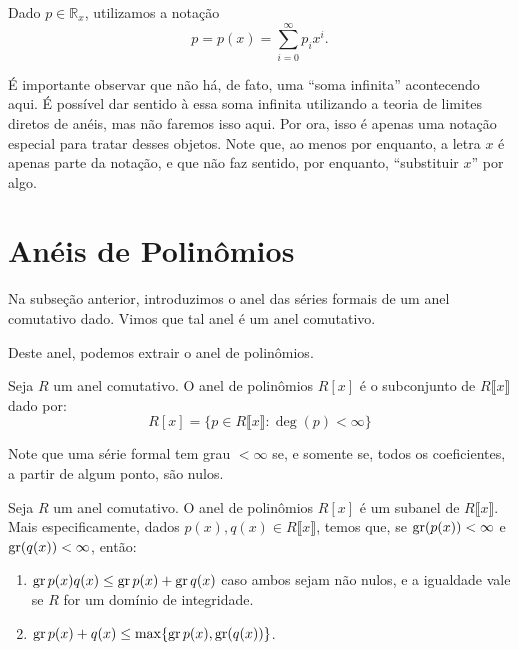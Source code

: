 Dado $p \in \mathbb R_x$, utilizamos a notação $$p=p(x)=\sum_{i=0}^\infty p_ix^i.$$

É importante observar que não há, de fato, uma ``soma infinita'' acontecendo aqui. É possível dar sentido à essa soma infinita utilizando a teoria de limites diretos de anéis, mas não faremos isso aqui. Por ora, isso é apenas uma notação especial para tratar desses objetos. Note que, ao menos por enquanto, a letra $x$ é apenas parte da notação, e que não faz sentido, por enquanto, ``substituir $x$'' por algo.
\section{Anéis de Polinômios}
Na subseção anterior, introduzimos o anel das séries formais de um anel comutativo dado. Vimos que tal anel é um anel comutativo.

Deste anel, podemos extrair o anel de polinômios.

\begin{definition}
Seja $R$ um anel comutativo. O anel de polinômios $R[x]$ é o subconjunto de $R\llbracket x \rrbracket$ dado por:
$$R[x]=\{p \in R\llbracket x \rrbracket: \deg(p) < \infty\}$$
\end{definition}

Note que uma série formal tem grau $<\infty$ se, e somente se, todos os coeficientes, a partir de algum ponto, são nulos.

\begin{lemma}
    Seja $R$ um anel comutativo. O anel de polinômios $R[x]$ é um subanel de $R\llbracket x \rrbracket$. Mais especificamente, dados $p(x), q(x) \in R\llbracket x \rrbracket$, temos que, se $\operatorname{gr}(p(x)) < \infty$ e $\operatorname{gr}(q(x)) < \infty$, então:

    \begin{enumerate}[label=\alph*)]
        \item $\operatorname{gr} p(x)q(x)\leq\operatorname{gr} p(x)+\operatorname{gr} q(x)$ caso ambos sejam não nulos, e a igualdade vale se $R$ for um domínio de integridade.
        \item $\operatorname{gr} p(x)+q(x)\leq \max\{\operatorname{gr} p(x),\operatorname{gr}(q(x))\}$.
    \end{enumerate}
\end{lemma}

